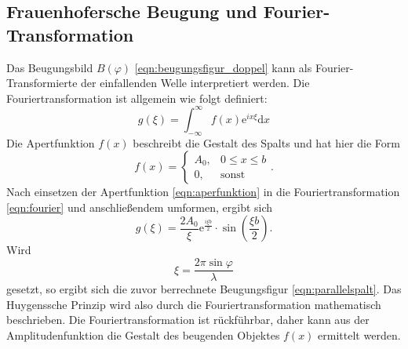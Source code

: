 \subsection{Frauenhofersche Beugung und Fourier-Transformation}
Das Beugungsbild $B(\varphi)$ \eqref{eqn:beugungsfigur_doppel} kann als Fourier-Transformierte der einfallenden Welle interpretiert werden.
Die Fouriertransformation ist allgemein wie folgt definiert:
\begin{equation}
    g(\xi) = \int_{-\infty}^\infty f(x) \mathrm{e}^{i x \xi} \mathrm{d}x
    \label{eqn:fourier}
\end{equation}
Die Apertfunktion $f(x)$ beschreibt die Gestalt des Spalts und hat hier die Form
\begin{equation}
    f(x) = \left \{ \begin{array}{ll} A_0, & 0 \leq x \leq b \\
    0, & \text{sonst}\end{array} \right. .
    \label{eqn:aperfunktion}
\end{equation}
Nach einsetzen der Apertfunktion \eqref{eqn:aperfunktion} in die Fouriertransformation \eqref{eqn:fourier} und anschließendem umformen, ergibt sich
\begin{equation}
    g(\xi) = \frac{2 A_0}{\xi} \mathrm{e}^\frac{i \xi b}{2} \cdot \sin \left( \frac{\xi b}{2} \right) .
    \label{eqn:fourier_erg}
\end{equation}
Wird 
\begin{equation*}
    \xi = \frac{2\pi \sin \varphi}{\lambda}
\end{equation*}
gesetzt, so ergibt sich die zuvor berrechnete Beugungsfigur \eqref{eqn:parallelspalt}.
Das Huygenssche Prinzip wird also durch die Fouriertransformation mathematisch beschrieben.
Die Fouriertransformation ist rückführbar, daher kann aus der Amplitudenfunktion die Gestalt des beugenden Objektes $f(x)$ ermittelt werden.
